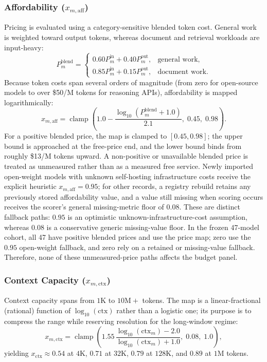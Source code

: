 \documentclass[pdflatex,sn-mathphys-num]{sn-jnl}
\theoremstyle{thmstyleone}
\theoremstyle{thmstylethree}
\begin{document}
\subsubsection{Affordability ($x_{m, \text{aff}}$)}
Pricing is evaluated using a category-sensitive blended token cost. General work is weighted toward output tokens, whereas document and retrieval workloads are input-heavy:
\begin{equation}\label{eq:price_blend}
P_m^{\text{blend}} = \begin{cases}
0.60 P_m^{\text{in}} + 0.40 P_m^{\text{out}}, & \text{general work}, \\[4pt]
0.85 P_m^{\text{in}} + 0.15 P_m^{\text{out}}, & \text{document work}.
\end{cases}
\end{equation}
Because token costs span several orders of magnitude (from zero for open-source models to over \$50/M tokens for reasoning APIs), affordability is mapped logarithmically:
\begin{equation}\label{eq:price_map}
x_{m, \text{aff}} = \operatorname{clamp}\left( 1.0 - \frac{\log_{10}(P_m^{\text{blend}} + 1.0)}{2.1}, \; 0.45, \; 0.98 \right).
\end{equation}
For a positive blended price, the map is clamped to $[0.45,0.98]$; the upper bound is approached at the free-price end, and the lower bound binds from roughly \$13/M tokens upward. A non-positive or unavailable blended price is treated as unmeasured rather than as a measured free service. Newly imported open-weight models with unknown self-hosting infrastructure costs receive the explicit heuristic $x_{m,\text{aff}}=0.95$; for other records, a registry rebuild retains any previously stored affordability value, and a value still missing when scoring occurs receives the scorer's general missing-metric floor of $0.08$. These are distinct fallback paths: $0.95$ is an optimistic unknown-infrastructure-cost assumption, whereas $0.08$ is a conservative generic missing-value floor. In the frozen 47-model cohort, all 47 have positive blended prices and use the price map; zero use the $0.95$ open-weight fallback, and zero rely on a retained or missing-value fallback. Therefore, none of these unmeasured-price paths affects the budget panel.

\subsubsection{Context Capacity ($x_{m, \text{ctx}}$)}
Context capacity spans from $1\text{K}$ to $10\text{M}+$ tokens. The map is a linear-fractional (rational) function of $\log_{10}(\text{ctx})$ rather than a logistic one; its purpose is to compress the range while reserving resolution for the long-window regime:
\begin{equation}\label{eq:context_map}
x_{m, \text{ctx}} = \operatorname{clamp}\left( 1.55 \, \frac{\log_{10}(\text{ctx}_m) - 2.0}{\log_{10}(\text{ctx}_m) + 1.0}, \; 0.08, \; 1.0 \right),
\end{equation}
yielding $x_{\text{ctx}} \approx 0.54$ at $4\text{K}$, $0.71$ at $32\text{K}$, $0.79$ at $128\text{K}$, and $0.89$ at $1\text{M}$ tokens.
\end{document}
